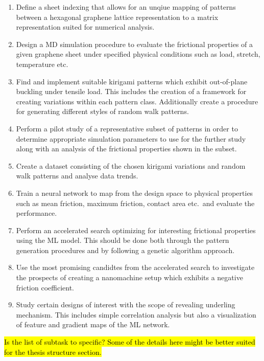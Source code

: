 \begin{enumerate}
    \item Define a sheet indexing that allows for an unqiue mapping of patterns between a hexagonal graphene lattice representation to a matrix representation suited for numerical analysis. 
    \item  Design a \acrshort{MD} simulation procedure to evaluate the frictional properties of a given graphene sheet under specified physical conditions such as load, stretch, temperature etc. 
    \item Find and implement suitable kirigami patterns which exhibit out-of-plane buckling under tensile load. This includes the creation of a framework for creating variations within each pattern class. Additionally create a procedure for generating different styles of random walk patterns.
    \item Perform a pilot study of a representative subset of patterns in order to determine appropriate simulation parameters to use for the further study along with an analysis of the frictional properties shown in the subset.
    \item Create a dataset consisting of the chosen kirigami variations and random walk patterns and analyse data trends.
    \item Train a neural network to map from the design space to physical properties such as mean friction, maximum friction, contact area etc.\ and evaluate the performance.
    \item Perform an accelerated search optimizing for interesting frictional properties using the \acrshort{ML} model. This should be done both through the pattern generation procedures and by following a genetic algorithm approach. 
    \item Use the most promising candidtes from the accelerated search to investigate the prospects of creating a nanomachine setup which exhibits a negative friction coefficient. 
    \item Study certain designs of interest with the scope of revealing underling mechanism. This includes simple correlation analysis but also a visualization of feature and gradient maps of the \acrshort{ML} network.
\end{enumerate}

\hl{Is the list of subtask to specific? Some of the details here might be better suited for the thesis structure section.}


